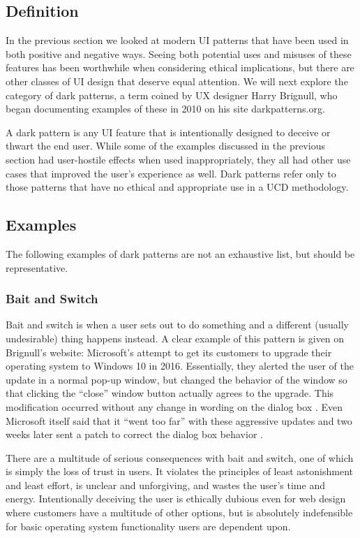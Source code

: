 \documentclass[12pt, oneside]{article}
\begin{document}
\subsection{Definition}

In the previous section we looked at modern UI patterns that have been used in both positive and negative ways. Seeing both potential uses and misuses of these features has been worthwhile when considering ethical implications, but there are other classes of UI design that deserve equal attention. We will next explore the category of dark patterns, a term coined by UX designer Harry Brignull, who began documenting examples of these in 2010 on his site darkpatterns.org.

A dark pattern is any UI feature that is intentionally designed to deceive or thwart the end user. While some of the examples discussed in the previous section had user-hostile effects when used inappropriately, they all had other use cases that improved the user's experience as well. Dark patterns refer only to those patterns that have no ethical and appropriate use in a UCD methodology.

\subsection{Examples}

The following examples of dark patterns are not an exhaustive list, but should be representative.

\subsubsection{Bait and Switch}

Bait and switch is when a user sets out to do something and a different (usually undesirable) thing happens instead. A clear example of this pattern is given on Brignull's website: Microsoft's attempt to get its customers to upgrade their operating system to Windows 10 in 2016. Essentially, they alerted the user of the update in a normal pop-up window, but changed the behavior of the window so that clicking the ``close'' window button actually agrees to the upgrade. This modification occurred without any change in wording on the dialog box \cite{thurrott_2016}. Even Microsoft itself said that it ``went too far'' with these aggressive updates and two weeks later sent a patch to correct the dialog box behavior \cite{popa_2016}.

There are a multitude of serious consequences with bait and switch, one of which is simply the loss of trust in users. It violates the principles of least astonishment and least effort, is unclear and unforgiving, and wastes the user's time and energy. Intentionally deceiving the user is ethically dubious even for web design where customers have a multitude of other options, but is absolutely indefensible for basic operating system functionality users are dependent upon.
\end{document}
